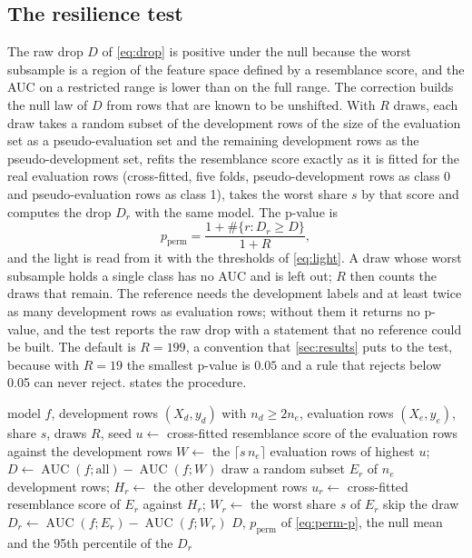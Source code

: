 \subsection{The resilience test}

The raw drop $D$ of \cref{eq:drop} is positive under the null because the worst subsample is a region of the feature space defined by a resemblance score, and the AUC on a restricted range is lower than on the full range. The correction builds the null law of $D$ from rows that are known to be unshifted. With $R$ draws, each draw takes a random subset of the development rows of the size of the evaluation set as a pseudo-evaluation set and the remaining development rows as the pseudo-development set, refits the resemblance score exactly as it is fitted for the real evaluation rows (cross-fitted, five folds, pseudo-development rows as class 0 and pseudo-evaluation rows as class 1), takes the worst share $s$ by that score and computes the drop $D_r$ with the same model. The p-value is
\begin{equation}
p_{\mathrm{perm}}=\frac{1+\#\{r:D_r\ge D\}}{1+R},
\label{eq:perm-p}
\end{equation}
and the light is read from it with the thresholds of \cref{eq:light}. A draw whose worst subsample holds a single class has no AUC and is left out; $R$ then counts the draws that remain. The reference needs the development labels and at least twice as many development rows as evaluation rows; without them it returns no p-value, and the test reports the raw drop with a statement that no reference could be built. The default is $R=199$, a convention that \cref{sec:results} puts to the test, because with $R=19$ the smallest p-value is $0.05$ and a rule that rejects below 0.05 can never reject.  states the procedure.

\begin{algorithm}[htbp]
\caption{Resilience test with a development-only permutation reference.}
\label{alg:resilience}
\begin{algorithmic}[1]
\Require model $f$, development rows $(X_d,y_d)$ with $n_d\ge 2n_e$, evaluation rows $(X_e,y_e)$, share $s$, draws $R$, seed
\State $u\gets$ cross-fitted resemblance score of the evaluation rows against the development rows
\State $W\gets$ the $\lceil s\,n_e\rceil$ evaluation rows of highest $u$; $D\gets\operatorname{AUC}(f;\text{all})-\operatorname{AUC}(f;W)$
  \State draw a random subset $E_r$ of $n_e$ development rows; $H_r\gets$ the other development rows
  \State $u_r\gets$ cross-fitted resemblance score of $E_r$ against $H_r$; $W_r\gets$ the worst share $s$ of $E_r$
   skip the draw \Else{} $D_r\gets\operatorname{AUC}(f;E_r)-\operatorname{AUC}(f;W_r)$ \EndIf
\EndFor
\State \Return $D$, $p_{\mathrm{perm}}$ of \cref{eq:perm-p}, the null mean and the 95th percentile of the $D_r$
\end{algorithmic}
\end{algorithm}

